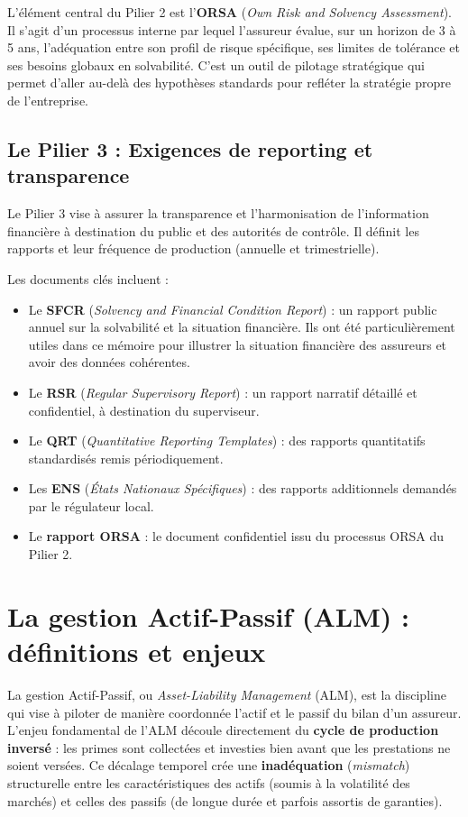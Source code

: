 L'élément central du Pilier 2 est l'\textbf{ORSA} (\textit{Own Risk and Solvency Assessment}). Il s'agit d'un processus interne par lequel l'assureur évalue, sur un horizon de 3 à 5 ans, l'adéquation entre son profil de risque spécifique, ses limites de tolérance et ses besoins globaux en solvabilité. C'est un outil de pilotage stratégique qui permet d'aller au-delà des hypothèses standards pour refléter la stratégie propre de l'entreprise.
\subsection{Le Pilier 3 : Exigences de reporting et transparence}

Le Pilier 3 vise à assurer la transparence et l'harmonisation de l'information financière à destination du public et des autorités de contrôle. Il définit les rapports et leur fréquence de production (annuelle et trimestrielle).

\bigskip

Les documents clés incluent :
\begin{itemize}
    \item Le \textbf{SFCR} (\textit{Solvency and Financial Condition Report}) : un rapport public annuel sur la solvabilité et la situation financière. Ils ont été particulièrement utiles dans ce mémoire pour illustrer la situation financière des assureurs et avoir des données cohérentes.
        \item Le \textbf{RSR} (\textit{Regular Supervisory Report}) : un rapport narratif détaillé et confidentiel, à destination du superviseur.
        \item Le \textbf{QRT} (\textit{Quantitative Reporting Templates}) : des rapports quantitatifs standardisés remis périodiquement.
        \item Les \textbf{ENS} (\textit{États Nationaux Spécifiques}) : des rapports additionnels demandés par le régulateur local.
        \item Le \textbf{rapport ORSA} : le document confidentiel issu du processus ORSA du Pilier 2.
\end{itemize}

\section{La gestion Actif-Passif (ALM) : définitions et enjeux}
\label{sec:alm}

La gestion Actif-Passif, ou \textit{Asset-Liability Management} (ALM), est la discipline qui vise à piloter de manière coordonnée l'actif et le passif du bilan d'un assureur. L'enjeu fondamental de l'ALM découle directement du \textbf{cycle de production inversé} : les primes sont collectées et investies bien avant que les prestations ne soient versées. Ce décalage temporel crée une \textbf{inadéquation} (\textit{mismatch}) structurelle entre les caractéristiques des actifs (soumis à la volatilité des marchés) et celles des passifs (de longue durée et parfois assortis de garanties).

